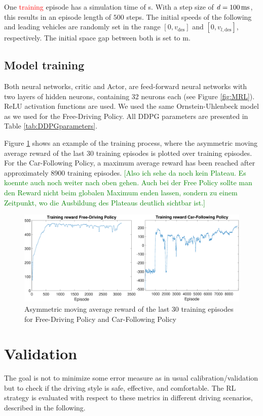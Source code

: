 \documentclass[review]{elsarticle}
\providecommand{\red}[1]{\textcolor{red}{#1}}
\providecommand{\green}[1]{\textcolor{green}{#1}}
\providecommand{\martin}[1]{\red{#1}} %
\providecommand{\martinc}[1]{\green{[#1]}} %
\providecommand{\sub}[1]{_{\mathrm{#1}}}  %
\providecommand{\3}{{\ss}}
\begin{document}
One \martin{training} episode has a simulation time of \unit[50]{s}.  With a step size of
$d=\unit[100]{ms}$, this results in an episode length of $500$
steps. The initial speeds of the following and leading vehicles are
randomly set in the range $[0,v\sub{des}]$ and $[0,v_{l,\text{des}}]$,
respectively. The initial space gap between both is set to \unit[120]{m}. 

\subsection{Model training}
Both neural networks, critic and Actor, are feed-forward neural networks with two layers of hidden neurons, containing 32 neurons each (see Figure \ref{fig:MRL}). ReLU activation functions are used. We used the same Ornstein-Uhlenbeck model as we used for the Free-Driving Policy.
All DDPG parameters are presented in Table \ref{tab:DDPGparameters}.

Figure \ref{fig:TrainingReward} shows an example of the training
process, where the asymmetric moving average reward of the last 30
training episodes is plotted over training episodes. For the
Car-Following Policy, a maximum average reward has been reached after
approximately 8900 training episodes.  \martinc{Also ich sehe da noch
  kein Plateau. Es koennte auch noch weiter nach oben gehen. Auch bei
  der Free Policy sollte man den Reward nicht beim globalen Maximum
  enden lassen, sondern zu einem Zeitpunkt, wo die Ausbildung des
  Plateaus deutlich sichtbar ist.}
%
\begin{figure}
	\centering
	\includegraphics[width=12cm]{images/TrainingReward}
	\caption{Asymmetric moving average reward of the last 30 training episodes for Free-Driving Policy and Car-Following Policy} 
	\label{fig:TrainingReward}
\end{figure}








\section{Validation}
\label{sec:validation}
The goal is not to minimize some error measure as in usual
calibration/validation but to check if the driving style is safe,
effective, and comfortable. The RL strategy is evaluated with respect to these metrics in different driving scenarios, described in the following.
\end{document}
